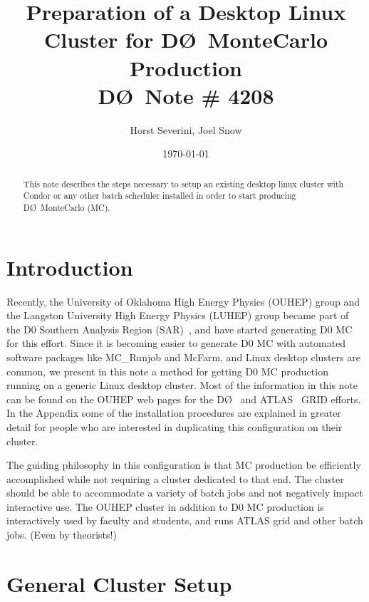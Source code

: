 \documentclass{revtex4}
\newcommand{\DO}{\mbox{D\O}}
\begin{document}
\title{Preparation of a Desktop Linux Cluster for 
\DO\ MonteCarlo Production\\\DO\ Note \# 4208}

\author{Horst Severini, Joel Snow}
\date{\today}

\begin{abstract}

This note describes the steps necessary to setup 
an existing desktop linux cluster with Condor or any other 
batch scheduler installed in order to start producing \DO\ MonteCarlo (MC).

\end{abstract}

\maketitle

\section{Introduction}

Recently, the University of Oklahoma High Energy Physics (OUHEP) group
and the Langston University High Energy Physics (LUHEP) group
became part of the D0 Southern Analysis Region (SAR)~\cite{d0sar}, and have 
started generating D0 MC for this effort. Since it is becoming easier to
generate D0 MC with automated software packages like MC\_Runjob and
McFarm, and Linux desktop clusters are common, we present in this note
a method for getting D0 MC production running on a generic Linux
desktop cluster. Most of the information in this note can be found on
the OUHEP web pages for the \DO ~\cite{oud0grid} and 
ATLAS~\cite{ouatlasgrid} GRID efforts. In the
Appendix some of the installation procedures are explained in greater
detail for people who are interested in duplicating this
configuration on their cluster.

The guiding philosophy in this configuration is that MC production be
efficiently accomplished while not requiring a cluster dedicated to
that end.  The cluster should be able to accommodate a variety of batch
jobs and not negatively impact interactive use.  The OUHEP cluster in
addition to D0 MC production is interactively used by faculty and
students, and runs ATLAS grid and other batch jobs. (Even by theorists!)

\section{General Cluster Setup}
\end{document}
